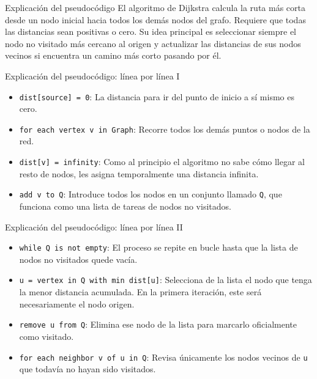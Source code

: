 \documentclass{beamer}
\begin{document}
    \begin{frame}{Explicación del pseudocódigo}
        El algoritmo de Dijkstra calcula la ruta más corta desde un nodo inicial hacia todos los demás nodos del grafo. Requiere que todas las distancias sean positivas o cero. Su idea principal es seleccionar siempre el nodo no visitado más cercano al origen y actualizar las distancias de sus nodos vecinos si encuentra un camino más corto pasando por él.
    \end{frame}

    \begin{frame}{Explicación del pseudocódigo: línea por línea I}
        \begin{itemize}
            \item \texttt{dist[source] = 0}: La distancia para ir del punto de inicio a sí mismo es cero.
            
            \item \texttt{for each vertex v in Graph}: Recorre todos los demás puntos o nodos de la red.
            
            \item \texttt{dist[v] = infinity}: Como al principio el algoritmo no sabe cómo llegar al resto de nodos, les asigna temporalmente una distancia infinita.
            
            \item \texttt{add v to Q}: Introduce todos los nodos en un conjunto llamado \texttt{Q}, que funciona como una lista de tareas de nodos no visitados.
        \end{itemize}
    \end{frame}

    \begin{frame}{Explicación del pseudocódigo: línea por línea II}
        \begin{itemize}
            \item \texttt{while Q is not empty}: El proceso se repite en bucle hasta que la lista de nodos no visitados quede vacía.
            
            \item \texttt{u = vertex in Q with min dist[u]}: Selecciona de la lista el nodo que tenga la menor distancia acumulada. En la primera iteración, este será necesariamente el nodo origen.
            
            \item \texttt{remove u from Q}: Elimina ese nodo de la lista para marcarlo oficialmente como visitado.
            
            \item \texttt{for each neighbor v of u in Q}: Revisa únicamente los nodos vecinos de \texttt{u} que todavía no hayan sido visitados.
        \end{itemize}
    \end{frame}
\end{document}
